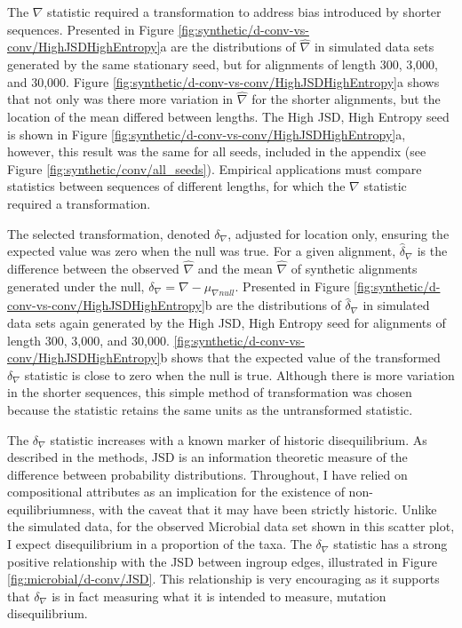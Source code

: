 

The $\nabla$ statistic required a transformation to address bias introduced by shorter sequences. Presented in Figure \ref{fig:synthetic/d-conv-vs-conv/HighJSDHighEntropy}a are the distributions of $\hat \nabla$ in simulated data sets generated by the same stationary seed, but for alignments of length 300, 3,000, and 30,000. Figure \ref{fig:synthetic/d-conv-vs-conv/HighJSDHighEntropy}a shows that not only was there more variation in $\hat \nabla$ for the shorter alignments, but the location of the mean differed between lengths. The High JSD, High Entropy seed is shown in Figure \ref{fig:synthetic/d-conv-vs-conv/HighJSDHighEntropy}a, however, this result was the same for all seeds, included in the appendix (see Figure \ref{fig:synthetic/conv/all_seeds}). Empirical applications must compare statistics between sequences of different lengths, for which the $\nabla$ statistic required a transformation. 



The selected transformation, denoted $\delta_\nabla$, adjusted for location only, ensuring the expected value was zero when the null was true. For a given alignment, $\hat \delta_\nabla$ is the difference between the observed $\hat \nabla$ and the mean  $\hat \nabla$ of synthetic alignments generated under the null, $\delta_\nabla =  \nabla - \mu_{\nabla{null}}.$ Presented in Figure \ref{fig:synthetic/d-conv-vs-conv/HighJSDHighEntropy}b are the distributions of $\hat \delta_\nabla$ in simulated data sets again generated by the High JSD, High Entropy seed for alignments of length 300, 3,000, and 30,000. \ref{fig:synthetic/d-conv-vs-conv/HighJSDHighEntropy}b shows that the expected value of the transformed $\delta_\nabla$ statistic is close to zero when the null is true. Although there is more variation in the shorter sequences, this simple method of transformation was chosen because the statistic retains the same units as the untransformed statistic. 

The $\delta_\nabla$ statistic increases with a known marker of historic disequilibrium. As described in the methods, JSD is an information theoretic measure of the difference between probability distributions. Throughout, I have relied on compositional attributes as an implication for the existence of non-equilibriumness, with the caveat that it may have been strictly historic. Unlike the simulated data, for the observed Microbial data set shown in this scatter plot, I expect disequilibrium in a proportion of the taxa. The $\delta_\nabla$ statistic has a strong positive relationship with the JSD between ingroup edges, illustrated in Figure \ref{fig:microbial/d-conv/JSD}. This relationship is very encouraging as it supports that $\delta_\nabla$ is in fact measuring what it is intended to measure, mutation disequilibrium. 

